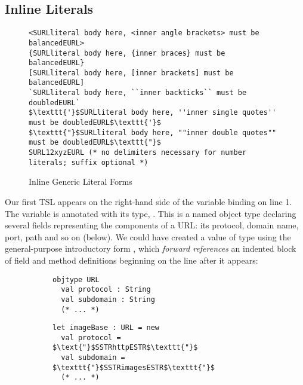 \subsection{Inline Literals}
\begin{figure}[t]
\begin{lstlisting}[numbers=none]
<SURLliteral body here, <inner angle brackets> must be balancedEURL>
{SURLliteral body here, {inner braces} must be balancedEURL}
[SURLliteral body here, [inner brackets] must be balancedEURL]
`SURLliteral body here, ``inner backticks`` must be doubledEURL`
$\texttt{'}$SURLliteral body here, ''inner single quotes'' must be doubledEURL$\texttt{'}$
$\texttt{"}$SURLliteral body here, ""inner double quotes"" must be doubledEURL$\texttt{"}$
SURL12xyzEURL (* no delimiters necessary for number literals; suffix optional *)
\end{lstlisting}
\caption{Inline Generic Literal Forms}
\label{f-delims}
\end{figure}
Our first TSL appears on the right-hand side of the variable binding on line 1. The variable  is annotated with its type, . This is a named {object type} declaring several fields representing the components of a URL: its protocol, domain name, port, path and so on (below). We could have created a value of type  using the general-purpose introductory form , which \emph{forward references} an indented block of field and method definitions beginning on the line after it appears:
\begin{figure}[h]
\vspace{-22px}
\begin{subfigure}[t]{.50\textwidth}
\begin{lstlisting}
objtype URL
  val protocol : String
  val subdomain : String
  (* ... *)
\end{lstlisting}
\end{subfigure}
\begin{subfigure}[t]{.50\textwidth}
\begin{lstlisting}
let imageBase : URL = new 
  val protocol = $\text{"}$SSTRhttpESTR$\texttt{"}$
  val subdomain = $\texttt{"}$SSTRimagesESTR$\texttt{"}$
  (* ... *)
\end{lstlisting}
\end{subfigure}
\vspace{-24px}
\end{figure}

